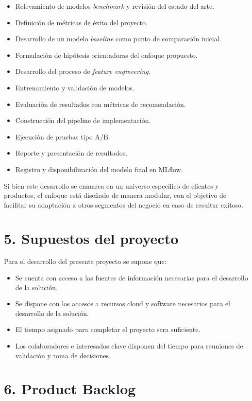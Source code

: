 \documentclass[
11pt, %
]{charter}
\begin{document}
\begin{itemize}
\item Relevamiento de modelos \textit{benchmark} y revisión del estado del arte.
\item Definición de métricas de éxito del proyecto.
\item Desarrollo de un modelo \textit{baseline} como punto de comparación inicial.
\item Formulación de hipótesis orientadoras del enfoque propuesto.
\item Desarrollo del proceso de \textit{feature engineering}.
\item Entrenamiento y validación de modelos.
\item Evaluación de resultados con métricas de recomendación.
\item Construcción del pipeline de implementación.
\item Ejecución de pruebas tipo A/B.
\item Reporte y presentación de resultados.
\item Registro y disponibilización del modelo final en MLflow.
\end{itemize}

Si bien este desarrollo se enmarca en un universo específico de clientes y productos, el enfoque está diseñado de manera modular, con el objetivo de facilitar su adaptación a otros segmentos del negocio en caso de resultar exitoso.

\section{5. Supuestos del proyecto}
\label{sec:supuestos}

Para el desarrollo del presente proyecto se supone que: 
\begin{itemize}
	\item Se cuenta con acceso a las fuentes de información necesarias para el desarrollo de la solución. 
	\item Se dispone con los accesos a recursos cloud y software necesarios para el desarrollo de la solución. 
	\item El tiempo asignado para completar el proyecto sera suficiente.
        \item Los colaboradores e interesados clave disponen del tiempo para reuniones de validación y toma de decisiones.
\end{itemize}

\section{6. Product Backlog}
\label{sec:backlog}
\end{document}
